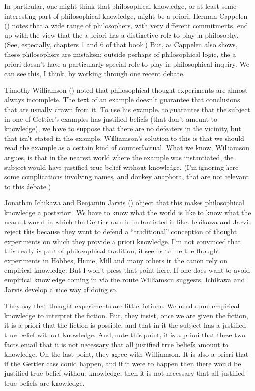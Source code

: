 \documentclass[
  11pt,
  letterpaper,
  DIV=11,
  numbers=noendperiod,
  twoside]{scrartcl}
\begin{document}
In particular, one might think that philosophical knowledge, or at least
some interesting part of philosophical knowledge, might be a priori.
Herman Cappelen () notes that a wide
range of philosophers, with very different commitments, end up with the
view that the a priori has a distinctive role to play in philosophy.
(See, especially, chapters 1 and 6 of that book.) But, as Cappelen also
shows, these philosophers are mistaken; outside perhaps of philosophical
logic, the a priori doesn't have a particularly special role to play in
philosophical inquiry. We can see this, I think, by working through one
recent debate.

Timothy Williamson () noted
that philosophical thought experiments are almost always incomplete. The
text of an example doesn't guarantee that conclusions that are usually
drawn from it. To use his example, to guarantee that the subject in one
of Gettier's examples has justified beliefs (that don't amount to
knowledge), we have to suppose that there are no defeaters in the
vicinity, but that isn't stated in the example. Williamson's solution to
this is that we should read the example as a certain kind of
counterfactual. What we know, Williamson argues, is that in the nearest
world where the example was instantiated, the subject would have
justified true belief without knowledge. (I'm ignoring here some
complications involving names, and donkey anaphora, that are not
relevant to this debate.)

Jonathan Ichikawa and Benjamin Jarvis
() object that this makes
philosophical knowledge a posteriori. We have to know what the world is
like to know what the nearest world in which the Gettier case is
instantiated is like. Ichikawa and Jarvis reject this because they want
to defend a ``traditional'' conception of thought experiments on which
they provide a priori knowledge. I'm not convinced that this really is
part of philosophical tradition; it seems to me the thought experiments
in Hobbes, Hume, Mill and many others in the canon rely on empirical
knowledge. But I won't press that point here. If one does want to avoid
empirical knowledge coming in via the route Williamson suggests,
Ichikawa and Jarvis develop a nice way of doing so.

They say that thought experiments are little fictions. We need some
empirical knowledge to interpret the fiction. But, they insist, once we
are given the fiction, it is a priori that the fiction is possible, and
that in it the subject has a justified true belief without knowledge.
And, note this point, it is a priori that these two facts entail that it
is not necessary that all justified true beliefs amount to knowledge. On
the last point, they agree with Williamson. It is also a priori that if
the Gettier case could happen, and if it were to happen then there would
be justified true belief without knowledge, then it is not necessary
that all justified true beliefs are knowledge.
\end{document}
